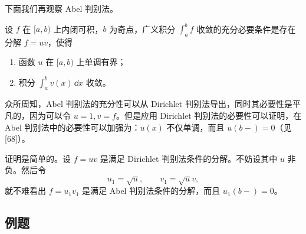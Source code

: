 下面我们再观察 Abel 判别法。

\begin{xproposition}
设 $f$ 在 $[a,b)$ 上内闭可积，$b$ 为奇点，广义积分 $\int_a^b f$ 收敛的充分必要条件是存在分解 $f=uv$，使得
\begin{enumerate}[label=(\arabic*)]
  \item 函数 $u$ 在 $[a,b)$ 上单调有界；
  \item 积分 $\int_a^b v(x)\,\dd x$ 收敛。
\end{enumerate}
\end{xproposition}

众所周知，Abel 判别法的充分性可以从 Dirichlet 判别法导出，同时其必要性是平凡的，因为可以令 $u=1,v=f$。但是应用 Dirichlet 判别法的必要性可以证明，在 Abel 判别法中的必要性可以加强为：$u(x)$ 不仅单调，而且 $u(b-)=0$（见 [68]）。

证明是简单的。设 $f=uv$ 是满足 Dirichlet 判别法条件的分解。不妨设其中 $u$ 非负。然后令
\[
  u_1=\sqrt{u},\qquad v_1=\sqrt{u}v,
\]
就不难看出 $f=u_1v_1$ 是满足 Abel 判别法条件的分解，而且 $u_1(b-)=0$。

\subsection{例题}

